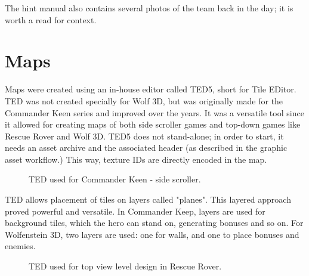 \documentclass[book.tex]{subfiles}
\begin{document}
     \begin{figure}[H]
\centering
   \end{figure}


\par 
The hint manual also contains several photos of the team back in the day; it is worth a read for context.













\section{Maps}
Maps were created using an in-house editor called TED5, short for Tile EDitor. TED was not created specially for Wolf 3D, but was originally made for the Commander Keen series and improved over the years. It was a versatile tool since it allowed for creating maps of both side scroller games and top-down games like Rescue Rover and Wolf 3D. TED5 does not stand-alone; in order to start, it needs an asset archive and the  associated header (as described in the graphic asset workflow.) This way, texture IDs are directly encoded in the map.\\

 \begin{figure}[H]
\centering
 \end{figure}

  \begin{figure}[H]
\centering
 \end{figure}


 \begin{figure}[H]
\centering
 \caption{TED used for Commander Keen - side scroller.} 
 \end{figure}

TED allows placement of tiles on layers called "planes". This layered approach proved powerful and versatile. In Commander Keep, layers are used for background tiles, which the hero can stand on, generating bonuses and so on. For Wolfenstein 3D, two layers are used: one for walls, and one to place bonuses and enemies.\\
\begin{figure}[H]
\centering
 \caption{TED used for top view level design in Rescue Rover.} 
 \end{figure}
\end{document}
